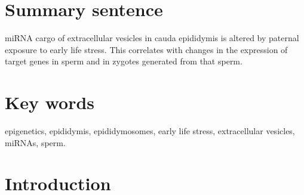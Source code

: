 \documentclass[12pt,twoside]{reedthesis}
\begin{document}
\hypertarget{summary-sentence}{%
\section{Summary sentence}\label{summary-sentence}}

miRNA cargo of extracellular vesicles in cauda epididymis is altered by
paternal exposure to early life stress. This correlates with changes in
the expression of target genes in sperm and in zygotes generated from
that sperm.

\hypertarget{key-words}{%
\section{Key words}\label{key-words}}

epigenetics, epididymis, epididymosomes, early life stress,
extracellular vesicles, miRNAs, sperm.

\newpage

\hypertarget{introduction-1}{%
\section{Introduction}\label{introduction-1}}
\end{document}
